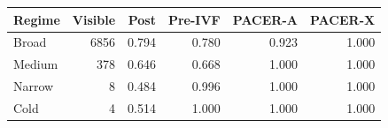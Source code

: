 \begin{tabular}{@{}lrrrrr@{}}
\toprule
Regime & Visible & Post & Pre-IVF & PACER-A & PACER-X\\
\midrule
Broad & 6856 & 0.794 & 0.780 & 0.923 & 1.000\\
Medium & 378 & 0.646 & 0.668 & 1.000 & 1.000\\
Narrow & 8 & 0.484 & 0.996 & 1.000 & 1.000\\
Cold & 4 & 0.514 & 1.000 & 1.000 & 1.000\\
\bottomrule
\end{tabular}
